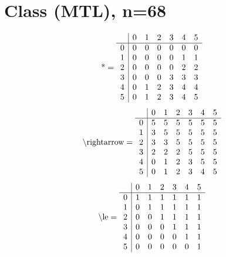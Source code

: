 \documentclass[11pt]{article}
\begin{document}
\section{Class (MTL), n=68}
\[\text{*} = 
\begin{array}{r | r r r r r r}
 & 0 & 1 & 2 & 3 & 4 & 5 \\ \hline
0 & 0 & 0 & 0 & 0 & 0 & 0 \\
1 & 0 & 0 & 0 & 0 & 1 & 1 \\
2 & 0 & 0 & 0 & 0 & 2 & 2 \\
3 & 0 & 0 & 0 & 3 & 3 & 3 \\
4 & 0 & 1 & 2 & 3 & 4 & 4 \\
5 & 0 & 1 & 2 & 3 & 4 & 5 \\
\end{array}
\]
\[\text{\textbackslash rightarrow} = 
\begin{array}{r | r r r r r r}
 & 0 & 1 & 2 & 3 & 4 & 5 \\ \hline
0 & 5 & 5 & 5 & 5 & 5 & 5 \\
1 & 3 & 5 & 5 & 5 & 5 & 5 \\
2 & 3 & 3 & 5 & 5 & 5 & 5 \\
3 & 2 & 2 & 2 & 5 & 5 & 5 \\
4 & 0 & 1 & 2 & 3 & 5 & 5 \\
5 & 0 & 1 & 2 & 3 & 4 & 5 \\
\end{array}
\]
\[\text{\textbackslash le} = 
\begin{array}{r | r r r r r r}
 & 0 & 1 & 2 & 3 & 4 & 5 \\ \hline
0 & 1 & 1 & 1 & 1 & 1 & 1 \\
1 & 0 & 1 & 1 & 1 & 1 & 1 \\
2 & 0 & 0 & 1 & 1 & 1 & 1 \\
3 & 0 & 0 & 0 & 1 & 1 & 1 \\
4 & 0 & 0 & 0 & 0 & 1 & 1 \\
5 & 0 & 0 & 0 & 0 & 0 & 1 \\
\end{array}
\]
\end{document}

